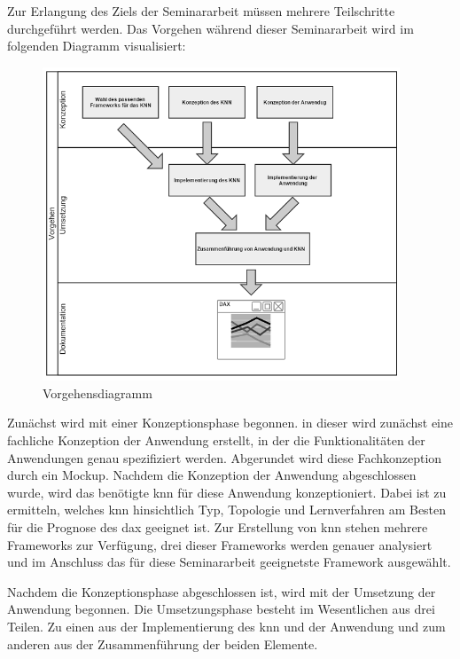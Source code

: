 \documentclass[a4paper,DIV11,bibliography=totoc,headings=normal,ngerman,headsepline,listof=totoc,parskip=half]{scrreprt}
\begin{document}
Zur Erlangung des Ziels der Seminararbeit müssen mehrere Teilschritte durchgeführt werden. Das Vorgehen während dieser Seminararbeit wird im folgenden Diagramm visualisiert:
 
\begin{figure}[htbp]
\centering
		\includegraphics[width=0.95\textwidth]{Vorgehensdiagramm.PNG}
	\caption{Vorgehensdiagramm}
	\label{fig:Vorgehensdiagramm}
\end{figure}


Zunächst wird mit einer Konzeptionsphase begonnen. in dieser wird zunächst eine fachliche Konzeption der Anwendung erstellt, in der die Funktionalitäten der Anwendungen genau spezifiziert werden. Abgerundet wird diese Fachkonzeption durch ein Mockup. Nachdem die Konzeption der Anwendung abgeschlossen wurde, wird das benötigte \ac{knn} für diese Anwendung konzeptioniert. Dabei ist zu ermitteln, welches \ac{knn} hinsichtlich Typ, Topologie und Lernverfahren am Besten für die Prognose des \ac{dax} geeignet ist. Zur Erstellung von \ac{knn} stehen mehrere Frameworks zur Verfügung, drei dieser Frameworks werden genauer analysiert und im Anschluss das für diese Seminararbeit geeignetste Framework ausgewählt.

Nachdem die Konzeptionsphase abgeschlossen ist, wird mit der Umsetzung der Anwendung begonnen. Die Umsetzungsphase besteht im Wesentlichen aus drei Teilen. Zu einen aus der Implementierung des \ac{knn} und der Anwendung und zum anderen aus der Zusammenführung der beiden Elemente. 
\end{document}
